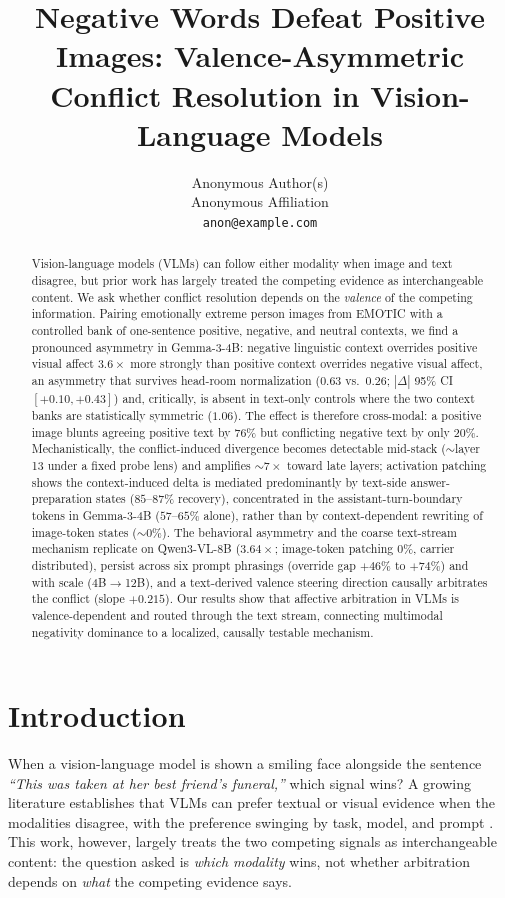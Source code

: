 \documentclass{article}
\title{Negative Words Defeat Positive Images: Valence-Asymmetric Conflict Resolution in Vision-Language Models}
\author{%
  Anonymous Author(s) \\
  Anonymous Affiliation \\
  \texttt{anon@example.com} \\
}
\newcommand{\gemma}{Gemma-3-4B}
\newcommand{\qwen}{Qwen3-VL-8B}
\begin{document}
\maketitle

\begin{abstract}
Vision-language models (VLMs) can follow either modality when image and text disagree, but prior work has largely treated the competing evidence as interchangeable content. We ask whether conflict resolution depends on the \emph{valence} of the competing information. Pairing emotionally extreme person images from EMOTIC with a controlled bank of one-sentence positive, negative, and neutral contexts, we find a pronounced asymmetry in \gemma{}: negative linguistic context overrides positive visual affect $3.6\times$ more strongly than positive context overrides negative visual affect, an asymmetry that survives head-room normalization ($0.63$ vs.\ $0.26$; $|\Delta|$ 95\% CI $[+0.10, +0.43]$) and, critically, is absent in text-only controls where the two context banks are statistically symmetric ($1.06$). The effect is therefore cross-modal: a positive image blunts agreeing positive text by $76\%$ but conflicting negative text by only $20\%$. Mechanistically, the conflict-induced divergence becomes detectable mid-stack (${\sim}$layer 13 under a fixed probe lens) and amplifies ${\sim}7\times$ toward late layers; activation patching shows the context-induced delta is mediated predominantly by text-side answer-preparation states ($85$--$87\%$ recovery), concentrated in the assistant-turn-boundary tokens in \gemma{} ($57$--$65\%$ alone), rather than by context-dependent rewriting of image-token states (${\sim}0\%$). The behavioral asymmetry and the coarse text-stream mechanism replicate on \qwen{} ($3.64\times$; image-token patching $0\%$, carrier distributed), persist across six prompt phrasings (override gap $+46\%$ to $+74\%$) and with scale ($4$B$\to$12B), and a text-derived valence steering direction causally arbitrates the conflict (slope $+0.215$). Our results show that affective arbitration in VLMs is valence-dependent and routed through the text stream, connecting multimodal negativity dominance to a localized, causally testable mechanism.
\end{abstract}

\section{Introduction}
\label{sec:intro}

When a vision-language model is shown a smiling face alongside the sentence \emph{``This was taken at her best friend's funeral,''} which signal wins? A growing literature establishes that VLMs can prefer textual or visual evidence when the modalities disagree, with the preference swinging by task, model, and prompt \citep{deng2025blindfaith, mixedsignals2025, contextvqa2026, signpost2026}. This work, however, largely treats the two competing signals as interchangeable content: the question asked is \emph{which modality} wins, not whether arbitration depends on \emph{what} the competing evidence says.
\end{document}
